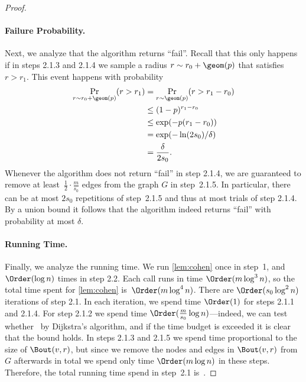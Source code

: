 \begin{proof}
\paragraph{Failure Probability.}
Next, we analyze that the algorithm returns ``fail''. Recall that this only happens if in steps 2.1.3 and 2.1.4 we sample a radius $r \sim r_0 + \geom(p)$ that satisfies~$r > r_1$. This event happens with probability
\begin{align*}
    \Pr_{r \sim r_0 + \geom(p)}(r > r_1) &= \Pr_{r \sim \geom(p)}(r > r_1 - r_0) \\
    &\leq (1 - p)^{r_1 - r_0} \\
    &\leq \exp(-p(r_1 - r_0)) \\
    &= \exp(-\ln(2s_0) / \delta) \\
    &= \frac{\delta}{2s_0}.
\end{align*}
Whenever the algorithm does not return ``fail'' in step 2.1.4, we are guaranteed to remove at least~$\frac{1}{2} \cdot \frac{m}{s_0}$ edges from the graph $G$ in step~2.1.5. In particular, there can be at most $2s_0$ repetitions of step~2.1.5 and thus at most trials of step 2.1.4. By a union bound it follows that the algorithm indeed returns ``fail'' with probability at most $\delta$.

\paragraph{Running Time.}
Finally, we analyze the running time. We run \cref{lem:cohen} once in step~1, and $\Order(\log n)$ times in step 2.2. Each call runs in time $\Order(m \log^3 n)$, so the total time spent for \cref{lem:cohen} is~$\Order(m \log^4 n)$. There are $\Order(s_0 \log^2 n)$ iterations of step 2.1. In each iteration, we spend time $\Order(1)$ for steps 2.1.1 and 2.1.4. For step 2.1.2 we spend time $\Order(\frac{m}{s_0} \log n)$---indeed, we can test whether~ by Dijkstra's algorithm, and if the time budget is exceeded it is clear that the bound holds. In steps 2.1.3 and 2.1.5 we spend time proportional to the size of $\Bout(v, r)$, but since we remove the nodes and edges in $\Bout(v, r)$ from $G$ afterwards in total we spend only time $\Order(m \log n)$ in these steps. Therefore, the total running time spend in step~2.1 is~.
\end{proof}

